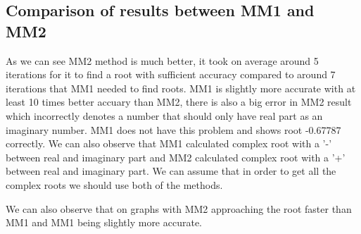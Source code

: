 \subsection{Comparison of results between MM1 and MM2}
As we can see MM2 method is much better, it took on average around 5 iterations for it to find a root with sufficient accuracy compared to around 7 iterations that MM1 needed to find roots.  MM1 is slightly more accurate with at least 10 times better accuary than MM2, there is also a big error in MM2 result which incorrectly denotes a number that should only have real part as an imaginary number. MM1 does not have this problem and shows root -0.67787 correctly. We can also observe that MM1 calculated complex root with a '-' between real and imaginary part and MM2 calculated complex root with a '+' between real and imaginary part. We can assume that in order to get all the complex roots we should use both of the methods.

We can also observe that on graphs with MM2 approaching the root faster than MM1 and MM1 being slightly more accurate.
